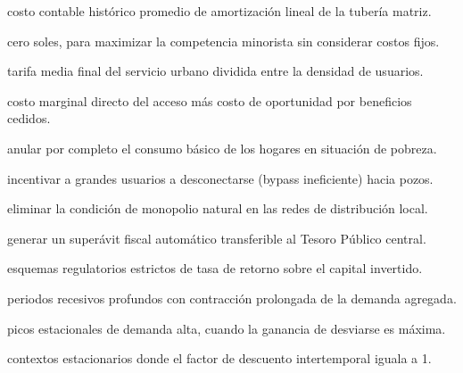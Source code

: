 \begin{opts}
    \item costo contable histórico promedio de amortización lineal de la tubería matriz.
    \item cero soles, para maximizar la competencia minorista sin considerar costos fijos.
    \item tarifa media final del servicio urbano dividida entre la densidad de usuarios.
    \item costo marginal directo del acceso más costo de oportunidad por beneficios cedidos.
\end{opts}

\begin{opts}
    \item anular por completo el consumo básico de los hogares en situación de pobreza.
    \item incentivar a grandes usuarios a desconectarse (bypass ineficiente) hacia pozos.
    \item eliminar la condición de monopolio natural en las redes de distribución local.
    \item generar un superávit fiscal automático transferible al Tesoro Público central.
\end{opts}

\begin{opts}
    \item esquemas regulatorios estrictos de tasa de retorno sobre el capital invertido.
    \item periodos recesivos profundos con contracción prolongada de la demanda agregada.
    \item picos estacionales de demanda alta, cuando la ganancia de desviarse es máxima.
    \item contextos estacionarios donde el factor de descuento intertemporal iguala a 1.
\end{opts}

